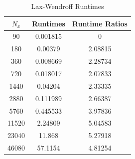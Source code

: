 \documentclass[12pt]{article}
\begin{document}
\begin{minipage}{0.5\textwidth}
\begin{table}[H]
\caption{Lax-Wendroff Runtimes}
\centering\begin{tabular}{||c|cc||}
\hline \hline
    $N_x$ &   Runtimes &   Runtime Ratios \\
\hline
    90 &   0.001815 &          0       \\
   180 &   0.00379  &          2.08815 \\
   360 &   0.008669 &          2.28734 \\
   720 &   0.018017 &          2.07833 \\
  1440 &   0.04204  &          2.33335 \\
  2880 &   0.111989 &          2.66387 \\
  5760 &   0.445533 &          3.97836 \\
 11520 &   2.24809  &          5.04583 \\
 23040 &  11.868    &          5.27918 \\
 46080 &  57.1154   &          4.81254 \\
\hline \hline
\end{tabular}\end{table}\end{minipage}
\newpage
\end{document}
